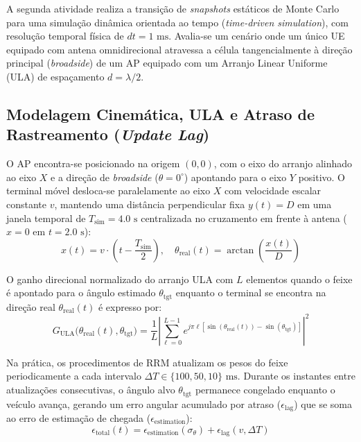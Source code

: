 A segunda atividade realiza a transição de \textit{snapshots} estáticos de Monte Carlo para uma simulação dinâmica orientada ao tempo (\textit{time-driven simulation}), com resolução temporal física de $dt = 1\text{ ms}$. Avalia-se um cenário onde um único UE equipado com antena omnidirecional atravessa a célula tangencialmente à direção principal (\textit{broadside}) de um AP equipado com um Arranjo Linear Uniforme (ULA) de espaçamento $d = \lambda / 2$.

\subsection{Modelagem Cinemática, ULA e Atraso de Rastreamento (\textit{Update Lag})}

O AP encontra-se posicionado na origem $(0,0)$, com o eixo do arranjo alinhado ao eixo $X$ e a direção de \textit{broadside} ($\theta = 0^\circ$) apontando para o eixo $Y$ positivo. O terminal móvel desloca-se paralelamente ao eixo $X$ com velocidade escalar constante $v$, mantendo uma distância perpendicular fixa $y(t) = D$ em uma janela temporal de $T_{\text{sim}} = 4.0\text{ s}$ centralizada no cruzamento em frente à antena ($x = 0$ em $t = 2.0\text{ s}$):
\begin{equation}
    x(t) = v \cdot \left(t - \frac{T_{\text{sim}}}{2}\right), \quad \theta_{\text{real}}(t) = \arctan\left(\frac{x(t)}{D}\right)
\end{equation}

O ganho direcional normalizado do arranjo ULA com $L$ elementos quando o feixe é apontado para o ângulo estimado $\theta_{\text{tgt}}$ enquanto o terminal se encontra na direção real $\theta_{\text{real}}(t)$ é expresso por:
\begin{equation}
    G_{\text{ULA}}\big(\theta_{\text{real}}(t), \theta_{\text{tgt}}\big) = \frac{1}{L} \left| \sum_{\ell=0}^{L-1} e^{j \pi \ell \left[\sin(\theta_{\text{real}}(t)) - \sin(\theta_{\text{tgt}})\right]} \right|^2
\end{equation}

Na prática, os procedimentos de RRM atualizam os pesos do feixe periodicamente a cada intervalo $\Delta T \in \{100, 50, 10\}\text{ ms}$. Durante os instantes entre atualizações consecutivas, o ângulo alvo $\theta_{\text{tgt}}$ permanece congelado enquanto o veículo avança, gerando um erro angular acumulado por atraso ($\epsilon_{\text{lag}}$) que se soma ao erro de estimação de chegada ($\epsilon_{\text{estimation}}$):
\begin{equation}
    \epsilon_{\text{total}}(t) = \epsilon_{\text{estimation}}(\sigma_\theta) + \epsilon_{\text{lag}}(v, \Delta T)
\end{equation}

